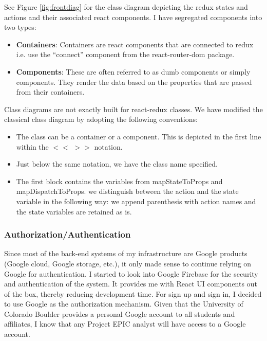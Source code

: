 See Figure \ref{fig:frontdiag} for the class diagram depicting the redux states and actions and their associated react components. I have segregated components into two types:

\begin{itemize}
    \item \textbf{Containers}: Containers are react components that are connected to redux i.e. use the “connect” component from the react-router-dom package.
    \item \textbf{Components}: These are often referred to as dumb components or simply components. They render the data based on the properties that are passed from their containers.
\end{itemize}

Class diagrams are not exactly built for react-redux classes. We have modified the classical class diagram by adopting the following conventions:

\begin{itemize}
    \item The class can be a container or a component. This is depicted in the first line within the $<<$ $>>$ notation.
    \item Just below the same notation, we have the class name specified. 
    \item The first block contains the variables from mapStateToProps and mapDispatchToProps. we distinguish between the action and the state variable in the following way: we append parenthesis with action names and the state variables are retained as is.
\end{itemize}

\subsubsection{Authorization/Authentication}

Since most of the back-end systems of my infrastructure are Google products (Google cloud, Google storage, etc.), it only made sense to continue relying on Google for authentication. I started to look into Google Firebase for the security and authentication of the system. It provides me with React UI components out of the box, thereby reducing development time. For sign up and sign in, I decided to use Google as the authorization mechanism. Given that the University of Colorado Boulder provides a personal Google account to all students and affiliates, I know that any Project EPIC analyst will have access to a Google account. 

